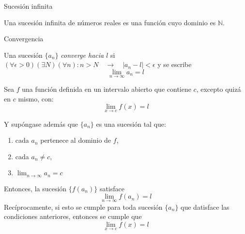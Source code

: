 \documentclass[14pt,a4paper]{extarticle}
\begin{document}
\begin{mydef}{Sucesi\'on infinita}

Una sucesi\'on infinita de n\'umeros reales es una funci\'on cuyo
dominio es \(\mathbb{N}\).
\end{mydef}
\begin{mydef}{Convergencia}

Una sucesi\'on \( \{ a_n \} \) \emph{converge hacia \( l \)} si  \(
(\forall \epsilon > 0) (\exists N) (\forall n)  :   n > N
\quad \to \quad | a_n - l | < \epsilon \) y se escribe
\[ \lim_{n \to \infty} a_n = l \]
\end{mydef}
\begin{theorem}
Sea \( f \) una funci\'on definida en un intervalo abierto que contiene
\( c \), excepto quiz\'a en \( c \) mismo, con:
\[ \lim_{x \to c} f(x) = l \]

Y sup\'ongase adem\'as que \( \{ a_n \} \) es una sucesi\'on tal que:
\begin{enumerate}
\item cada \( a_n \) pertenece al dominio de \( f \),
\item cada \( a_n \neq c \),
\item \(\lim_{n \to \infty} a_n = c\)
\end{enumerate}

Entonces, la sucesi\'on \( \{ f(a_n) \} \) satisface
\[ \lim_{n \to \infty} f(a_n) = l\]
Rec\'iprocamente, si esto se cumple para toda sucesi\'on \( \{ a_n \}
\) que datisface las condiciones anteriores, entonces se cumple que
\[ \lim_{x \to c} f(x) = l \]
\end{theorem}
\end{document}
